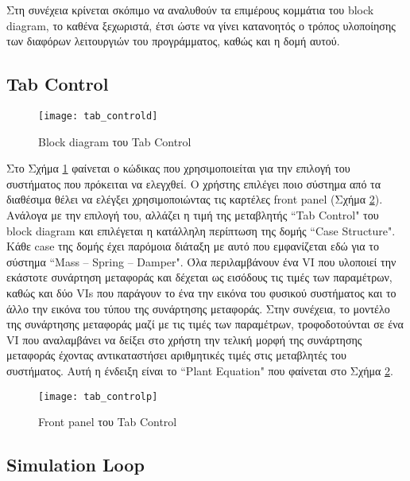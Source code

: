 Στη συνέχεια κρίνεται σκόπιμο να αναλυθούν τα επιμέρους κομμάτια του block diagram, το καθένα ξεχωριστά, έτσι ώστε να γίνει κατανοητός ο τρόπος υλοποίησης των διαφόρων λειτουργιών του προγράμματος, καθώς και η δομή αυτού.

\subsection{Tab Control}

\begin{figure}[h]
  \centering
  \texttt{[image: tab\_controld]}
  \caption{Block diagram του Tab Control}
  \label{fig:tab_controld}
\end{figure}

Στο Σχήμα \ref{fig:tab_controld} φαίνεται ο κώδικας που χρησιμοποιείται για την επιλογή του συστήματος που πρόκειται να ελεγχθεί. Ο χρήστης επιλέγει ποιο σύστημα από τα διαθέσιμα θέλει να ελέγξει χρησιμοποιώντας τις καρτέλες front panel (Σχήμα \ref{fig:tab_controlp}). Ανάλογα με την επιλογή του, αλλάζει η τιμή της μεταβλητής ``Tab Control" του block diagram και επιλέγεται η κατάλληλη περίπτωση της δομής ``Case Structure". Κάθε case της δομής έχει παρόμοια διάταξη με αυτό που εμφανίζεται εδώ για το σύστημα ``Mass -- Spring -- Damper". Όλα περιλαμβάνουν ένα VI που υλοποιεί την εκάστοτε συνάρτηση μεταφοράς και δέχεται ως εισόδους τις τιμές των παραμέτρων, καθώς και δύο VIs που παράγουν το ένα την εικόνα του φυσικού συστήματος και το άλλο την εικόνα του τύπου της συνάρτησης μεταφοράς. Στην συνέχεια, το μοντέλο της συνάρτησης μεταφοράς μαζί με τις τιμές των παραμέτρων, τροφοδοτούνται σε ένα VI που αναλαμβάνει να δείξει στο χρήστη την τελική μορφή της συνάρτησης μεταφοράς έχοντας αντικαταστήσει αριθμητικές τιμές στις μεταβλητές του συστήματος. Αυτή η ένδειξη είναι το ``Plant Equation" που φαίνεται στο Σχήμα \ref{fig:tab_controlp}.

\begin{figure}[h]
  \centering
  \texttt{[image: tab\_controlp]}
  \caption{Front panel του Tab Control}
  \label{fig:tab_controlp}
\end{figure}

\subsection{Simulation Loop}

